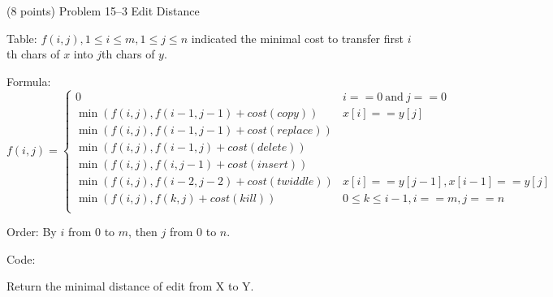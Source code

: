 \documentclass[paper=a4, fontsize=11pt]{scrartcl} %
\begin{document}
\begin{fancyquotes}
  (8 points) Problem 15--3 Edit Distance
\end{fancyquotes}

Table:
$f(i,j), 1\leq i\leq m, 1\leq j\leq n$ indicated the minimal cost to
transfer first $i$th chars of $x$ into $j$th chars of $y$.

Formula:
\begin{equation*}
  f(i,j) =
  \begin{cases}
    0 & i==0\ \text{and}\ j==0\\

    \min(f(i,j), f(i-1,j-1)+cost(copy)) & x[i]==y[j]\\
    \min(f(i,j), f(i-1,j-1)+cost(replace))\\
    \min(f(i,j), f(i-1,j)+cost(delete))\\
    \min(f(i,j), f(i,j-1)+cost(insert))\\
    \min(f(i,j), f(i-2,j-2)+cost(twiddle)) & x[i]==y[j-1],
    x[i-1]==y[j]\\
    \min(f(i,j), f(k,j)+cost(kill)) & 0\leq k\leq i-1, i==m, j==n\\
  \end{cases}
\end{equation*}

Order:
By $i$ from $0$ to $m$, then $j$ from $0$ to $n$.

Code:
\begin{algorithm}[H]
  \caption{Return the minimal distance of edit from X to Y.}
\end{algorithm}
\end{document}
